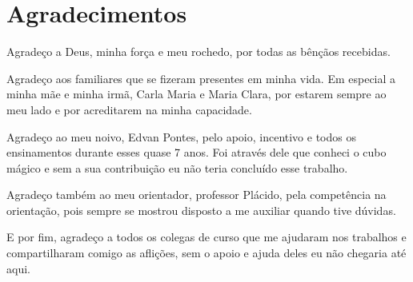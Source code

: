 
\chapter*{Agradecimentos}

Agradeço a Deus, minha força e meu rochedo, por todas as bênçãos recebidas.


Agradeço aos familiares que se fizeram presentes em minha vida. Em especial a minha mãe e minha irmã, Carla Maria e Maria Clara, por estarem sempre ao meu lado e por acreditarem na minha capacidade.



Agradeço ao meu noivo, Edvan Pontes, pelo apoio, incentivo e todos os ensinamentos durante esses quase 7 anos. Foi através dele que conheci o cubo mágico e sem a sua contribuição eu não teria concluído esse trabalho. 


Agradeço também ao meu orientador, professor Plácido, pela competência na orientação, pois sempre se mostrou disposto a me auxiliar quando tive dúvidas.

E por fim, agradeço a todos os colegas de curso que me ajudaram nos trabalhos e compartilharam comigo as aflições, sem o apoio e ajuda deles eu não chegaria até aqui. 